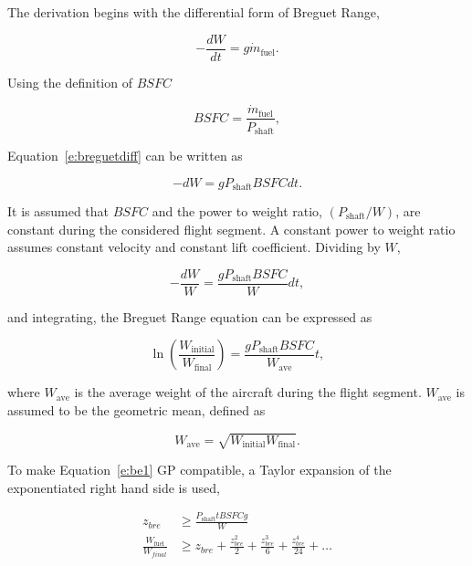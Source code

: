 \documentclass[]{aiaa-tc}%
\begin{document}
The derivation begins with the differential form of Breguet Range,\cite{br2}

\begin{equation}
    \label{e:breguetdiff}
    -\frac{dW}{dt} = g\dot{m}_{\text{fuel}}.
\end{equation}

Using the definition of $BSFC$

\begin{equation}
    \label{e:brBSFC}
    BSFC = \frac{\dot{m}_{\text{fuel}}}{P_{\text{shaft}}},
\end{equation}

Equation~\ref{e:breguetdiff} can be written as

\begin{equation}
    \label{e:brdiff2}
    -dW = g P_{\text{shaft}} BSFC dt.
\end{equation}

It is assumed that $BSFC$ and the power to weight ratio, $(P_{\text{shaft}}/W)$, are constant during the considered flight segment. 
A constant power to weight ratio assumes constant velocity and constant lift coefficient.\cite{br2}
Dividing by $W$,

\begin{equation}
    \label{e:brdiff2}
    -\frac{dW}{W} = \frac{g P_{\text{shaft}}BSFC }{W} dt,
\end{equation}

and integrating, the Breguet Range equation can be expressed as

\begin{equation}
    \label{e:be1}
    \ln{\left( \frac{W_{\text{initial}}}{W_{\text{final}}} \right)} = \frac{gP_{\text{shaft}}BSFC}{W_{\text{ave}}} t,
\end{equation}

where $W_{\text{ave}}$ is the average weight of the aircraft during the flight segment.  $W_{\text{ave}}$ is assumed to be the geometric mean, defined as

\begin{equation}
    \label{e:gpmean}
    W_{\text{ave}} = \sqrt{W_{\text{initial}}W_{\text{final}}}.
\end{equation}

    To make Equation~\ref{e:be1} GP compatible, a Taylor expansion of the exponentiated right hand side is used,\cite{hoburgthesis}

\begin{align}
    \label{e:brzbre}
    z_{bre} &\geq \frac{P_{\text{shaft}}t BSFC g}{W}\\
    \label{e:brtaylor}
    \frac{W_{\text{fuel}}}{W_{final}} &\geq z_{bre} + \frac{z_{bre}^2}{2} + \frac{z_{bre}^3}{6} + \frac{z_{bre}^4}{24} + \dots
\end{align}
\end{document}
